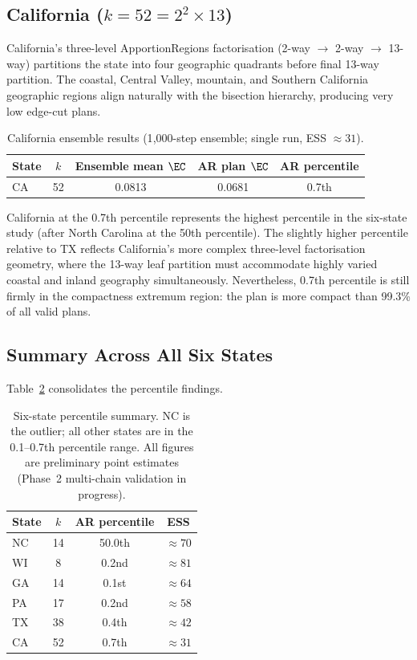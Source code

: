 \subsection{California ($k = 52 = 2^2 \times 13$)}

California's three-level ApportionRegions factorisation (2-way $\to$ 2-way $\to$ 13-way) partitions the state into four geographic quadrants before final 13-way partition. The coastal, Central Valley, mountain, and Southern California geographic regions align naturally with the bisection hierarchy, producing very low edge-cut plans.

\begin{table}[h]
\centering
\caption{California ensemble results (1{,}000-step \recom{} ensemble; single run, ESS $\approx 31$).}
\label{tab:ca-results}
\begin{tabular}{lcccc}
\toprule
State & $k$ & Ensemble mean $\EC$ & AR plan $\EC$ & AR percentile \\
\midrule
CA & 52 & 0.0813 & 0.0681 & 0.7th \\
\bottomrule
\end{tabular}
\end{table}

California at the 0.7th percentile represents the highest percentile in the six-state study (after North Carolina at the 50th percentile). The slightly higher percentile relative to TX reflects California's more complex three-level factorisation geometry, where the 13-way leaf partition must accommodate highly varied coastal and inland geography simultaneously. Nevertheless, 0.7th percentile is still firmly in the compactness extremum region: the \ar{} plan is more compact than 99.3\% of all valid \recom{} plans.

\subsection{Summary Across All Six States}

Table~\ref{tab:six-state-summary} consolidates the percentile findings.

\begin{table}[h]
\centering
\caption{Six-state percentile summary. NC is the outlier; all other states are in the 0.1--0.7th percentile range. All figures are preliminary point estimates (Phase~2 multi-chain validation in progress).}
\label{tab:six-state-summary}
\begin{tabular}{lccc}
\toprule
State & $k$ & AR percentile & ESS \\
\midrule
NC  & 14 & 50.0th & $\approx 70$ \\
WI  &  8 &  0.2nd & $\approx 81$ \\
GA  & 14 &  0.1st & $\approx 64$ \\
PA  & 17 &  0.2nd & $\approx 58$ \\
TX  & 38 &  0.4th & $\approx 42$ \\
CA  & 52 &  0.7th & $\approx 31$ \\
\bottomrule
\end{tabular}
\end{table}

